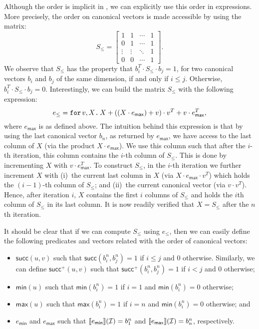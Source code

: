 Although the order is implicit in \langfor, we can explicitly use this order in \langfor expressions. More precisely, the order on canonical vectors is made accessible by
using the matrix:
\[
S_{\leq} = \begin{bmatrix}
1 & 1 & \cdots &  1 \\
0 & 1 & \cdots & 1\\
\vdots & \vdots & \ddots & 1 \\
0 & 0 & \cdots & 1 
\end{bmatrix}.
\] 
We observe that $S_{\leq}$ has the property that $b_i^T\cdot S_{\leq} \cdot b_j=1$, for two canonical vectors $b_i$ and $b_j$ of the same dimension, if and only if $i\leq j$. Otherwise, $b_i^T\cdot S_{\leq} \cdot b_j=0$. 
Interestingly, we can build the matrix $S_{\leq}$ with the following \langfor expression:
$$
e_{\leq}=\texttt{for}\, v,X \texttt{.}\, X + \left((X\cdot e_{\mathsf{max}}) + v \right)\cdot v^T + v\cdot e^T_{\mathsf{max}},
$$
where $e_{\mathsf{max}}$ is as defined above. The intuition behind this expression is that by using the last canonical vector $b_n$, as returned by $e_{\mathsf{max}}$, we have access to the last column of $X$ (via the product $X\cdot e_{\mathsf{max}}$). We use this column such that after the $i$-th iteration, this column contains the $i$-th column of $S_{\leq}$. This is done by incrementing $X$ with $v\cdot e_{\mathsf{max}}^T$.
To construct $S_{\leq}$, in the $i$-th iteration we further increment $X$ with 
(i)~the current last column in $X$ (via $X\cdot e_{\mathsf{max}}\cdot v^T$) which holds
the $(i-1)$-th column of $S_{\leq}$; and (ii)~the current canonical vector (via $v\cdot v^T$). Hence, after iteration $i$, $X$ contains the first $i$ columns of $S_{\leq}$ and holds the $i$th column of $S_{\leq}$ in its last column. It is now readily verified that $X=S_{\leq}$ after the $n$th iteration.

It should be clear that if we can compute $S_{\leq}$ using $e_{\leq}$, then we can easily define the following predicates and vectors related with the order of canonical vectors:
\begin{itemize}
	\item $\mathsf{succ}(u,v)$ such that $\mathsf{succ}(b_i^n,b_j^n)=1$ if $i\leq j$ and $0$ otherwise. Similarly, we can define
	$\mathsf{succ}^+(u,v)$ such that  $\mathsf{succ}^+(b_i^n,b_j^n)=1$ if $i < j$ and $0$ otherwise;
	\item $\mathsf{min}(u)$ such that  $\mathsf{min}(b_i^n)=1$ if $i=1$ and $\mathsf{min}(b_i^n)=0$ otherwise; 
	\item $\mathsf{max}(u)$ such that  $\mathsf{max}(b_i^n)=1$ if $i=n$ and $\mathsf{min}(b_i^n)=0$ otherwise; and
	\item $e_{\mathsf{min}}$ and $e_{\mathsf{max}}$ such that $\llbracket e_{\mathsf{min}} \rrbracket(\mathcal{I})=b_1^n$ and 
	$\llbracket e_{\mathsf{max}} \rrbracket(\mathcal{I})=b_n^n$, respectively.
\end{itemize}

